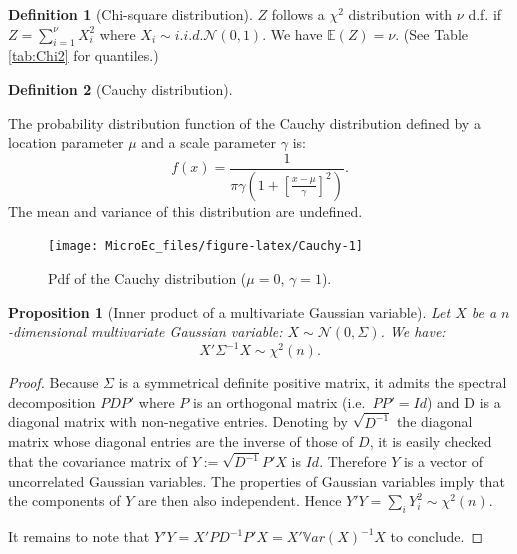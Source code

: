 \documentclass[
  12pt,
]{book}
\newtheorem{proposition}{Proposition}[chapter]
\theoremstyle{definition}
\newtheorem{definition}{Definition}[chapter]
\theoremstyle{definition}
\theoremstyle{definition}
\theoremstyle{definition}
\theoremstyle{remark}
\begin{document}
\begin{definition}[Chi-square distribution]
\protect\hypertarget{def:chi2}{}\label{def:chi2}\(Z\) follows a \(\chi^2\) distribution with \(\nu\) d.f. if \(Z = \sum_{i=1}^{\nu}X_i^2\) where \(X_i \sim i.i.d. \mathcal{N}(0,1)\).
We have \(\mathbb{E}(Z)=\nu\). (See Table \ref{tab:Chi2} for quantiles.)
\end{definition}

\begin{definition}[Cauchy distribution]
\protect\hypertarget{def:Cauchy}{}\label{def:Cauchy}\leavevmode

The probability distribution function of the Cauchy distribution defined by a location parameter \(\mu\) and a scale parameter \(\gamma\) is:
\[
f(x) = \frac{1}{\pi \gamma \left(1 + \left[\frac{x-\mu}{\gamma}\right]^2\right)}.
\]
The mean and variance of this distribution are undefined.

\begin{figure}
\texttt{[image: MicroEc\_files/figure-latex/Cauchy-1]} \caption{Pdf of the Cauchy distribution ($\mu=0$, $\gamma=1$).}\label{fig:Cauchy}
\end{figure}

\end{definition}

\begin{proposition}[Inner product of a multivariate Gaussian variable]
\protect\hypertarget{prp:waldtypeproduct}{}\label{prp:waldtypeproduct}Let \(X\) be a \(n\)-dimensional multivariate Gaussian variable: \(X \sim \mathcal{N}(0,\Sigma)\). We have:
\[
X' \Sigma^{-1}X \sim \chi^2(n).
\]
\end{proposition}

\begin{proof}
Because \(\Sigma\) is a symmetrical definite positive matrix, it admits the spectral decomposition \(PDP'\) where \(P\) is an orthogonal matrix (i.e.~\(PP'=Id\)) and D is a diagonal matrix with non-negative entries. Denoting by \(\sqrt{D^{-1}}\) the diagonal matrix whose diagonal entries are the inverse of those of \(D\), it is easily checked that the covariance matrix of \(Y:=\sqrt{D^{-1}}P'X\) is \(Id\). Therefore \(Y\) is a vector of uncorrelated Gaussian variables. The properties of Gaussian variables imply that the components of \(Y\) are then also independent. Hence \(Y'Y=\sum_i Y_i^2 \sim \chi^2(n)\).

It remains to note that \(Y'Y=X'PD^{-1}P'X=X'\mathbb{V}ar(X)^{-1}X\) to conclude.
\end{proof}
\end{document}
